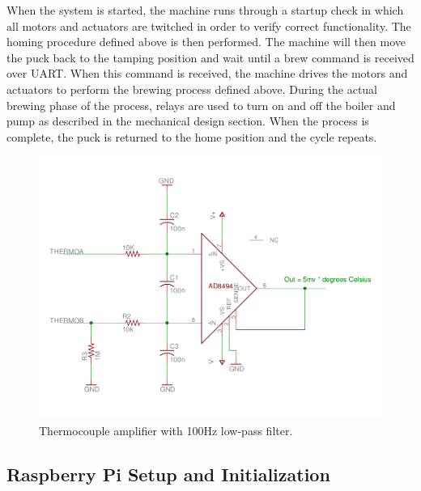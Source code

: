 \documentclass[conference]{IEEEtran}
\begin{document}
When the system is started, the machine runs through a
startup check in which all motors and actuators are twitched
in order to verify correct functionality. The homing procedure
defined above is then performed. The machine will then move
the puck back to the tamping position and wait until a brew
command is received over UART. When this command is
received, the machine drives the motors and actuators to
perform the brewing process defined above. During the actual
brewing phase of the process, relays are used to turn on and
off the boiler and pump as described in the mechanical design
section. When the process is complete, the puck is returned to
the home position and the cycle repeats.

\begin{figure}
  \centering
    \includegraphics[width=1.8\columnwidth]{ThermoAmp}
    \caption{Thermocouple amplifier with 100Hz low-pass filter.}
\end{figure}


\subsection{Raspberry Pi Setup and Initialization}
 
\end{document}
